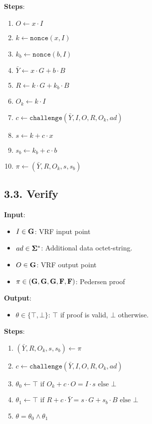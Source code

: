 \documentclass[
]{article}
\providecommand{\tightlist}{%
  \setlength{\itemsep}{0pt}\setlength{\parskip}{0pt}}
\begin{document}
\textbf{Steps}:

\begin{enumerate}
\def\labelenumi{\arabic{enumi}.}
\tightlist
\item
  \(O \gets x \cdot I\)
\item
  \(k \gets \texttt{nonce}(x, I)\)
\item
  \(k_b \gets \texttt{nonce}(b, I)\)
\item
  \(\bar{Y} \gets x \cdot G + b \cdot B\)
\item
  \(R \gets k \cdot G + k_b \cdot B\)
\item
  \(O_k \gets k \cdot I\)
\item
  \(c \gets \texttt{challenge}(\bar{Y}, I, O, R, O_k, ad)\)
\item
  \(s \gets k + c \cdot x\)
\item
  \(s_b \gets k_b + c \cdot b\)
\item
  \(\pi \gets (\bar{Y}, R, O_k, s, s_b)\)
\end{enumerate}

\subsection{3.3. Verify}\label{verify-1}

\textbf{Input}:

\begin{itemize}
\tightlist
\item
  \(I \in \bold{G}\): VRF input point
\item
  \(ad \in \bold{\Sigma}^*\): Additional data octet-string.
\item
  \(O \in \bold{G}\): VRF output point
\item
  \(\pi \in (\bold{G}, \bold{G}, \bold{G}, \bold{F}, \bold{F})\):
  Pedersen proof
\end{itemize}

\textbf{Output}:

\begin{itemize}
\tightlist
\item
  \(\theta \in \{ \top, \bot \}\): \(\top\) if proof is valid, \(\bot\)
  otherwise.
\end{itemize}

\textbf{Steps}:

\begin{enumerate}
\def\labelenumi{\arabic{enumi}.}
\tightlist
\item
  \((\bar{Y}, R, O_k, s, s_b) \gets \pi\)
\item
  \(c \gets \texttt{challenge}(\bar{Y}, I, O, R, O_k, ad)\)
\item
  \(\theta_0 \gets \top \text{ if } O_k + c \cdot O = I \cdot s \text{ else } \bot\)
\item
  \(\theta_1 \gets \top \text{ if } R + c \cdot \bar{Y} = s \cdot G + s_b \cdot B \text{ else } \bot\)
\item
  \(\theta = \theta_0 \land \theta_1\)
\end{enumerate}
\end{document}
